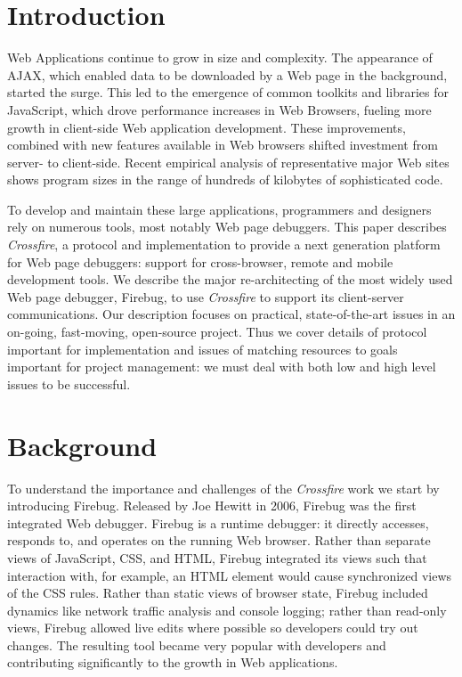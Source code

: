 
\section{Introduction}
Web Applications continue to grow in size and complexity. The
appearance of AJAX, which enabled data to be downloaded by a Web page
in the background, started the surge. This led to the emergence of common
toolkits and libraries for JavaScript, which drove  performance increases in Web Browsers, fueling more growth in client-side Web application development.
These improvements, combined with new features available in Web browsers shifted
investment from server- to client-side. Recent empirical analysis of
representative
 major Web sites shows program sizes in the range of hundreds of kilobytes of
sophisticated code.\cite{VitekDynamicJS2010}

To develop and maintain these large applications, programmers and designers rely
on numerous tools, most notably Web page debuggers. This paper describes
\textit{Crossfire}, a protocol and implementation to provide a next generation
platform for Web page debuggers: support for cross-browser, remote and mobile 
development tools. We describe the major re-architecting of the most widely used Web
page debugger, Firebug, to use \textit{Crossfire} to support its client-server
communications. Our description focuses on practical, state-of-the-art issues in
an on-going, fast-moving, open-source project. Thus we cover details of protocol
important for implementation and issues of matching resources to goals important
for project management: we must deal with both low and high level issues to
be successful.

\section{Background}
To understand the importance and challenges of the \textit{Crossfire} work we
start by introducing Firebug. Released by Joe Hewitt in 2006, Firebug was the
first integrated Web debugger. Firebug is a runtime debugger: it directly
accesses, responds to, and operates on the running Web browser.  Rather than
separate views of JavaScript, CSS, and HTML, Firebug integrated its views such
that interaction with, for example, an HTML element would cause synchronized
views of the CSS rules. Rather than static
 views of browser state, Firebug included dynamics like network traffic analysis
 and console logging; rather
than read-only views, Firebug allowed live edits where possible so developers
could try out changes. The resulting tool became very popular with developers
and contributing significantly to the growth in Web applications.

